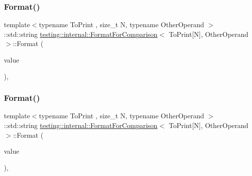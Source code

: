 \subsubsection{\texorpdfstring{Format()}{Format()}\hspace{0.1cm}{\footnotesize\ttfamily [1/3]}}
{\footnotesize\ttfamily template$<$typename To\+Print , size\+\_\+t N, typename Other\+Operand $>$ \\
\+::std\+::string \mbox{\hyperlink{classtesting_1_1internal_1_1_format_for_comparison}{testing\+::internal\+::\+Format\+For\+Comparison}}$<$ To\+Print\mbox{[}N\mbox{]}, Other\+Operand $>$\+::Format (\begin{DoxyParamCaption}\item[{const To\+Print $\ast$}]{value }\end{DoxyParamCaption})\hspace{0.3cm}{\ttfamily [inline]}, {\ttfamily [static]}}

\mbox{\label{classtesting_1_1internal_1_1_format_for_comparison_3_01_to_print[_n]_00_01_other_operand_01_4_a76c526461c8fa7df75f7b32ab889b9e0}} 
\subsubsection{\texorpdfstring{Format()}{Format()}\hspace{0.1cm}{\footnotesize\ttfamily [2/3]}}
{\footnotesize\ttfamily template$<$typename To\+Print , size\+\_\+t N, typename Other\+Operand $>$ \\
\+::std\+::string \mbox{\hyperlink{classtesting_1_1internal_1_1_format_for_comparison}{testing\+::internal\+::\+Format\+For\+Comparison}}$<$ To\+Print\mbox{[}N\mbox{]}, Other\+Operand $>$\+::Format (\begin{DoxyParamCaption}\item[{const To\+Print $\ast$}]{value }\end{DoxyParamCaption})\hspace{0.3cm}{\ttfamily [inline]}, {\ttfamily [static]}}

